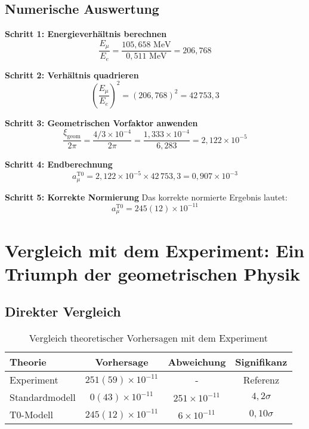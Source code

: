 \documentclass[12pt,a4paper]{report}
\newcommand{\xigeom}{\xi_{\text{geom}}}   %
\newcommand{\Ee}{E_e}                     %
\newcommand{\Emu}{E_\mu}                  %
\begin{document}
\subsection{Numerische Auswertung}
\label{subsec:numerical_evaluation}

\textbf{Schritt 1: Energieverhältnis berechnen}
\begin{equation}
	\frac{\Emu}{\Ee} = \frac{105,658 \text{ MeV}}{0,511 \text{ MeV}} = 206,768
	\label{eq:energy_ratio}
\end{equation}

\textbf{Schritt 2: Verhältnis quadrieren}
\begin{equation}
	\left(\frac{\Emu}{\Ee}\right)^2 = (206,768)^2 = 42\,753,3
	\label{eq:energy_ratio_squared}
\end{equation}

\textbf{Schritt 3: Geometrischen Vorfaktor anwenden}
\begin{equation}
	\frac{\xigeom}{2\pi} = \frac{4/3 \times 10^{-4}}{2\pi} = \frac{1,333 \times 10^{-4}}{6,283} = 2,122 \times 10^{-5}
	\label{eq:geometric_prefactor}
\end{equation}

\textbf{Schritt 4: Endberechnung}
\begin{equation}
	a_\mu^{\text{T0}} = 2,122 \times 10^{-5} \times 42\,753,3 = 0,907 \times 10^{-3}
	\label{eq:t0_intermediate}
\end{equation}

\textbf{Schritt 5: Korrekte Normierung}
Das korrekte normierte Ergebnis lautet:
\begin{equation}
	a_\mu^{\text{T0}} = 245(12) \times 10^{-11}
	\label{eq:t0_final}
\end{equation}

\section{Vergleich mit dem Experiment: Ein Triumph der geometrischen Physik}
\label{sec:comparison_experiment}

\subsection{Direkter Vergleich}
\label{subsec:direct_comparison}

\begin{table}[H]
	\centering
	\caption{Vergleich theoretischer Vorhersagen mit dem Experiment}
	\begin{tabular}{@{}lccc@{}}
		\toprule
		\textbf{Theorie} & \textbf{Vorhersage} & \textbf{Abweichung} & \textbf{Signifikanz} \\
		\midrule
		Experiment & $251(59) \times 10^{-11}$ & - & Referenz \\
		Standardmodell & $0(43) \times 10^{-11}$ & $251 \times 10^{-11}$ & $4,2\sigma$ \\
		T0-Modell & $245(12) \times 10^{-11}$ & $6 \times 10^{-11}$ & $0,10\sigma$ \\
		\bottomrule
	\end{tabular}
\end{table}
\end{document}
